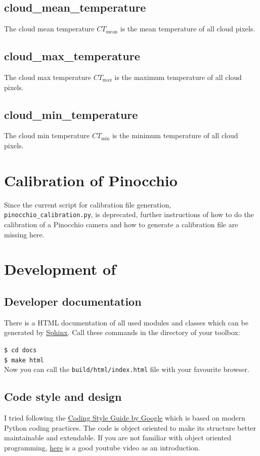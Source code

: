 \documentclass[11pt,a4paper]{article}
\begin{document}
\subsection{cloud\_mean\_temperature}
The cloud mean temperature $CT_\text{mean}$ is the mean temperature of all cloud pixels.

\subsection{cloud\_max\_temperature}
The cloud max temperature $CT_\text{max}$ is the maximum temperature of all cloud pixels.

\subsection{cloud\_min\_temperature}
The cloud min temperature $CT_\text{min}$ is the minimum temperature of all cloud pixels.

\section{Calibration of Pinocchio}
\label{sec:calibration}
Since the current script for calibration file generation, \texttt{pinocchio\_calibration.py}, is deprecated, further instructions of how to do the calibration of a Pinocchio camera and how to generate a calibration file are missing here.

\section{Development of \cloud}
\label{sec:development}

\subsection{Developer documentation}
There is a HTML documentation of all used modules and classes which can be generated by \href{http://www.sphinx-doc.org/en/stable/install.html}{Sphinx}. Call these commands in the directory of your \cloud toolbox:

\texttt{\$ cd docs}\\
\texttt{\$ make html}\\

Now you can call the \texttt{build/html/index.html} file with your favourite browser.

\subsection{Code style and design}
I tried following the \href{https://google.github.io/styleguide/pyguide.html}{Coding Style Guide by Google}  which is based on modern Python coding practices. The code is object oriented to make its structure better maintainable and extendable. If you are not familiar with object oriented programming, \href{https://www.youtube.com/watch?v=ZDa-Z5JzLYM}{here} is a good youtube video as an introduction.\\
\end{document}
